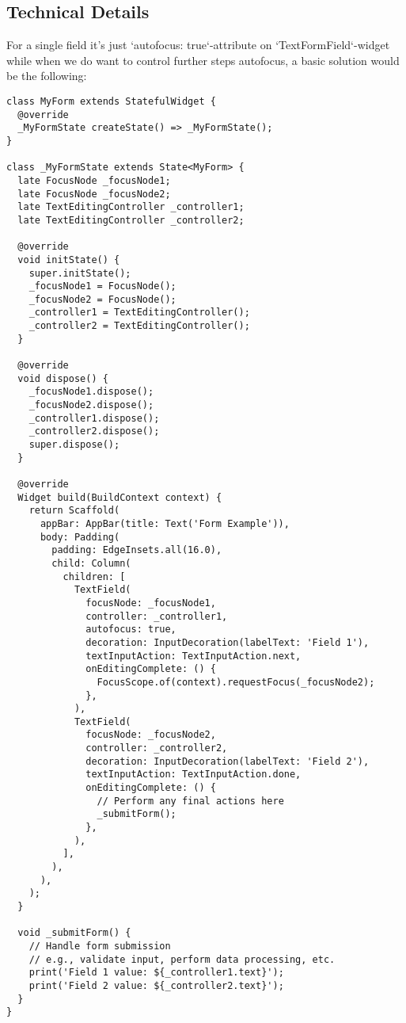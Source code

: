 \subsection{Technical Details}

For a single field it's just `autofocus: true`-attribute on `TextFormField`-widget while when we do want to control 
further steps autofocus, a basic solution would be the following:

\begin{lstlisting}
class MyForm extends StatefulWidget {
  @override
  _MyFormState createState() => _MyFormState();
}

class _MyFormState extends State<MyForm> {
  late FocusNode _focusNode1;
  late FocusNode _focusNode2;
  late TextEditingController _controller1;
  late TextEditingController _controller2;

  @override
  void initState() {
    super.initState();
    _focusNode1 = FocusNode();
    _focusNode2 = FocusNode();
    _controller1 = TextEditingController();
    _controller2 = TextEditingController();
  }

  @override
  void dispose() {
    _focusNode1.dispose();
    _focusNode2.dispose();
    _controller1.dispose();
    _controller2.dispose();
    super.dispose();
  }

  @override
  Widget build(BuildContext context) {
    return Scaffold(
      appBar: AppBar(title: Text('Form Example')),
      body: Padding(
        padding: EdgeInsets.all(16.0),
        child: Column(
          children: [
            TextField(
              focusNode: _focusNode1,
              controller: _controller1,
              autofocus: true,
              decoration: InputDecoration(labelText: 'Field 1'),
              textInputAction: TextInputAction.next,
              onEditingComplete: () {
                FocusScope.of(context).requestFocus(_focusNode2);
              },
            ),
            TextField(
              focusNode: _focusNode2,
              controller: _controller2,
              decoration: InputDecoration(labelText: 'Field 2'),
              textInputAction: TextInputAction.done,
              onEditingComplete: () {
                // Perform any final actions here
                _submitForm();
              },
            ),
          ],
        ),
      ),
    );
  }

  void _submitForm() {
    // Handle form submission
    // e.g., validate input, perform data processing, etc.
    print('Field 1 value: ${_controller1.text}');
    print('Field 2 value: ${_controller2.text}');
  }
}
\end{lstlisting}

